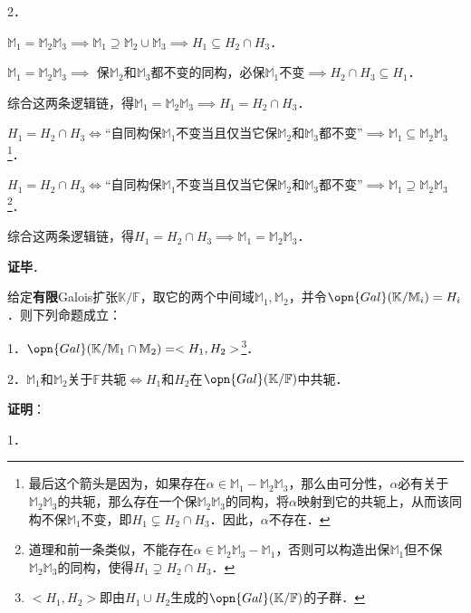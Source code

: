 2．

$\mathbb{M}_1=\mathbb{M}_2\mathbb{M}_3\implies \mathbb{M}_1\supseteq\mathbb{M}_2\cup\mathbb{M}_3\implies H_1\subseteq H_2\cap H_3$．

$\mathbb{M}_1=\mathbb{M}_2\mathbb{M}_3\implies$ 保$\mathbb{M}_2$和$\mathbb{M}_3$都不变的同构，必保$\mathbb{M}_1$不变$\implies H_2\cap H_3\subseteq H_1$．

综合这两条逻辑链，得$\mathbb{M}_1=\mathbb{M}_2\mathbb{M}_3 \implies H_1=H_2\cap H_3$．

$H_1=H_2\cap H_3\iff$“自同构保$\mathbb{M}_1$不变当且仅当它保$\mathbb{M}_2$和$\mathbb{M}_3$都不变”$\implies \mathbb{M}_1\subseteq\mathbb{M}_2\mathbb{M}_3$\footnote{最后这个箭头是因为，如果存在$\alpha\in\mathbb{M}_1-\mathbb{M}_2\mathbb{M}_3$，那么由可分性，$\alpha$必有关于$\mathbb{M}_2\mathbb{M}_3$的共轭，那么存在一个保$\mathbb{M}_2\mathbb{M}_3$的同构，将$\alpha$映射到它的共轭上，从而该同构不保$\mathbb{M}_1$不变，即$H_1\subsetneq H_2\cap H_3$．因此，$\alpha$不存在．}．

$H_1=H_2\cap H_3\iff$“自同构保$\mathbb{M}_1$不变当且仅当它保$\mathbb{M}_2$和$\mathbb{M}_3$都不变”$\implies \mathbb{M}_1\supseteq\mathbb{M}_2\mathbb{M}_3$\footnote{道理和前一条类似，不能存在$\alpha\in\mathbb{M}_2\mathbb{M}_3-\mathbb{M}_1$，否则可以构造出保$\mathbb{M}_1$但不保$\mathbb{M}_2\mathbb{M}_3$的同构，使得$H_1\supsetneq H_2\cap H_3$．}．

综合这两条逻辑链，得$H_1=H_2\cap H_3 \implies \mathbb{M}_1=\mathbb{M}_2\mathbb{M}_3$．


\textbf{证毕}．









\begin{theorem}{}
给定\textbf{有限}Galois扩张$\mathbb{K}/\mathbb{F}$，取它的两个中间域$\mathbb{M}_1, \mathbb{M}_2$，并令$\opn{Gal}(\mathbb{K}/\mathbb{M}_i)=H_i$．则下列命题成立：

1．$\opn{Gal}(\mathbb{K}/\mathbb{M}_1\cap\mathbb{M}_2)=<H_1, H_2>$\footnote{$<H_1, H_2>$即由$H_1\cup H_2$生成的$\opn{Gal}(\mathbb{K}/\mathbb{F})$的子群．}．

2．$\mathbb{M}_1$和$\mathbb{M}_2$关于$\mathbb{F}$共轭$\iff H_1$和$H_2$在$\opn{Gal}(\mathbb{K}/\mathbb{F})$中共轭．

\end{theorem}

\textbf{证明}：

1．

